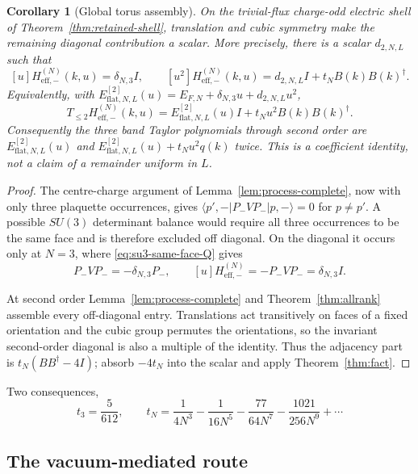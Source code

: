 \documentclass[11pt]{article}
\theoremstyle{plain}
\newtheorem{corollary}[theorem]{Corollary}
\theoremstyle{definition}
\theoremstyle{remark}
\newcommand{\chk}[1]{}
\newcommand{\dg}{^{\dagger}}
\begin{document}
\begin{corollary}[Global torus assembly]\label{cor:assembly}
On the trivial-flux charge-odd electric shell of
Theorem~\ref{thm:retained-shell}, translation and cubic symmetry make the
remaining diagonal contribution a scalar.  More precisely, there is a scalar
$d_{2,N,L}$ such that
\[
 [u]H^{(N)}_{\mathrm{eff},-}(k,u)=\delta_{N,3}I,
 \qquad
 [u^2]H^{(N)}_{\mathrm{eff},-}(k,u)
 =d_{2,N,L}I+t_NB(k)B(k)\dg .
\]
Equivalently, with
$E_{\mathrm{flat},N,L}^{[2]}(u)=E_{F,N}+\delta_{N,3}u+d_{2,N,L}u^2$,
\[
  T_{\le2}H^{(N)}_{\mathrm{eff},-}(k,u)
  =E_{\mathrm{flat},N,L}^{[2]}(u)I+t_Nu^2B(k)B(k)\dg .
\]
Consequently the three band Taylor polynomials through second order are
$E_{\mathrm{flat},N,L}^{[2]}(u)$ and
$E_{\mathrm{flat},N,L}^{[2]}(u)+t_Nu^2q(k)$ twice.  This is a coefficient
identity, not a claim of a remainder uniform in $L$.
\end{corollary}

\begin{proof}
The centre-charge argument of Lemma~\ref{lem:process-complete}, now with only
three plaquette occurrences, gives
$\langle p',-|P_-VP_-|p,-\rangle=0$ for $p\ne p'$. A possible $SU(3)$
determinant balance would require all three occurrences to be the same face
and is therefore excluded off diagonal. On the diagonal it occurs only at
$N=3$, where \eqref{eq:su3-same-face-Q} gives
\[
 P_-VP_-=-\delta_{N,3}P_-,
 \qquad
 [u]H^{(N)}_{\mathrm{eff},-}=-P_-VP_-=\delta_{N,3}I .
\]

At second order Lemma~\ref{lem:process-complete} and
Theorem~\ref{thm:allrank} assemble every off-diagonal entry. Translations act
transitively on faces of a fixed orientation and the cubic group permutes the
orientations, so the invariant second-order diagonal is also a multiple of the
identity. Thus the adjacency part is
$t_N(BB\dg-4I)$; absorb $-4t_N$ into the scalar and apply
Theorem~\ref{thm:fact}.
\end{proof}

Two consequences,
\begin{equation}\label{eq:tsmall}
  t_3=\frac{5}{612},\qquad
  t_N=\frac1{4N^3}-\frac1{16N^5}-\frac{77}{64N^7}-\frac{1021}{256N^9}+\cdots
\end{equation}
\chk{t\_2 = 0 and t\_3 = 5/612}\chk{large-N expansion of t\_N through 1/N\^{}9}

\subsection{The vacuum-mediated route}
\end{document}
